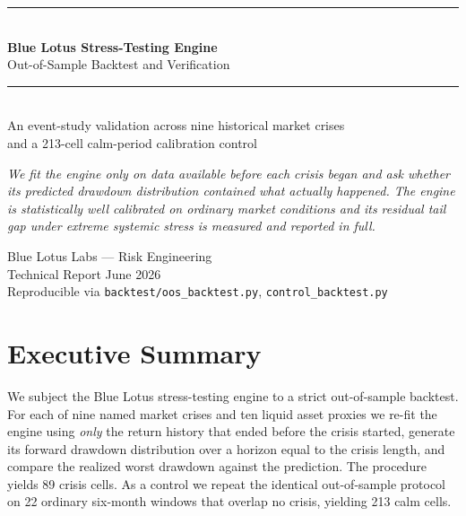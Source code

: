 \documentclass[11pt]{article}
\begin{document}
\begin{titlepage}
\centering
\vspace*{2.2cm}
{\color{blgold}\rule{\textwidth}{1.4pt}}\\[0.8em]
{\Huge\bfseries\color{bldark} Blue Lotus Stress-Testing Engine}\\[0.7em]
{\LARGE\color{blblue} Out-of-Sample Backtest and Verification}\\[0.5em]
{\color{blgold}\rule{\textwidth}{1.4pt}}\\[1.4em]
{\large An event-study validation across nine historical market crises}\\[0.4em]
{\large and a 213-cell calm-period calibration control}\\[2.6em]

\begin{minipage}{0.82\textwidth}\centering\itshape\color{blgrey}
We fit the engine only on data available before each crisis began and ask
whether its predicted drawdown distribution contained what actually happened.
The engine is statistically well calibrated on ordinary market conditions and
its residual tail gap under extreme systemic stress is measured and reported
in full.
\end{minipage}

\vfill
{\large Blue Lotus Labs --- Risk Engineering}\\[0.3em]
{\color{blgrey} Technical Report \textbar{} June 2026}\\[0.3em]
{\color{blgrey}\small Reproducible via \texttt{backtest/oos\_backtest.py}, \texttt{control\_backtest.py}}
\end{titlepage}

\section*{Executive Summary}

We subject the Blue Lotus stress-testing engine to a strict out-of-sample
backtest. For each of nine named market crises and ten liquid asset proxies we
re-fit the engine using \emph{only} the return history that ended before the
crisis started, generate its forward drawdown distribution over a horizon equal
to the crisis length, and compare the realized worst drawdown against the
prediction. The procedure yields 89 crisis cells. As a control we repeat the
identical out-of-sample protocol on 22 ordinary six-month windows that overlap
no crisis, yielding 213 calm cells.
\end{document}
